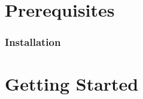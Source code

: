 \documentclass[utf8,aspectratio=169,ngerman,english]{beamer}
\begin{document}
\maketitle


\section{Prerequisites}

\begin{frame}
\frametitle{Installation}
\end{frame}

\section{Getting Started}
\end{document}

